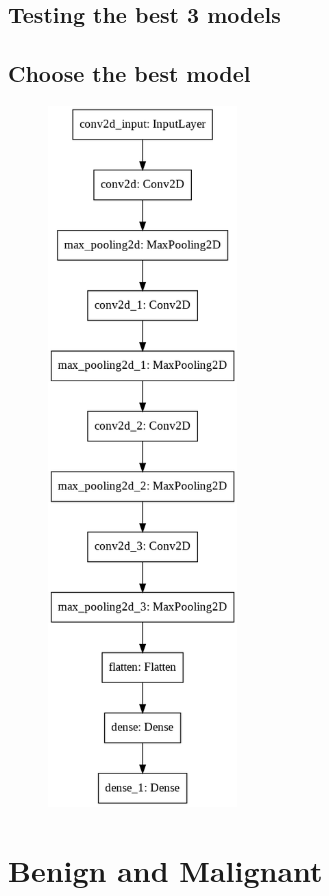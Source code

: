 \documentclass{book}
\begin{document}
            \subsection{Testing the best 3 models}
            \subsection{Choose the best model}


        


        \begin{figure}[h]
            \centering
            \includegraphics[width=5cm]{smc-best-model.png}
            \caption{}\label{fig:}
        \end{figure}

        \section{Benign and Malignant}  %
\end{document}
